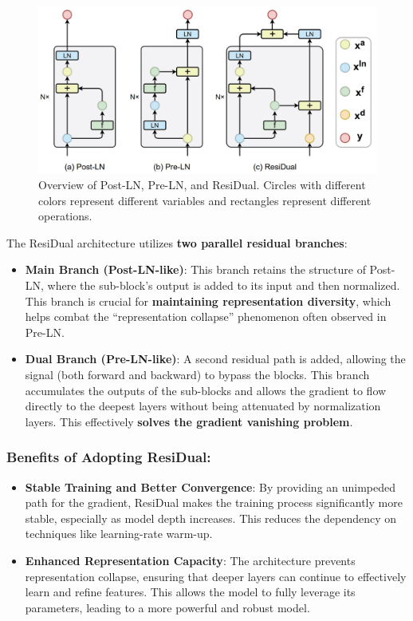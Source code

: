 \begin{figure}[H]
    \centering
    \includegraphics[width=1\linewidth]{image/residual.jpg}
    \caption{Overview of Post-LN, Pre-LN, and ResiDual. Circles with different colors represent different variables and rectangles represent different operations.}
    \label{fig:residual}
\end{figure}

The ResiDual architecture utilizes \textbf{two parallel residual branches}:

\begin{itemize}
    \item \textbf{Main Branch (Post-LN-like)}: This branch retains the structure of Post-LN, where the sub-block's output is added to its input and then normalized. This branch is crucial for \textbf{maintaining representation diversity}, which helps combat the ``representation collapse'' phenomenon often observed in Pre-LN.
    
    \item \textbf{Dual Branch (Pre-LN-like)}: A second residual path is added, allowing the signal (both forward and backward) to bypass the blocks. This branch accumulates the outputs of the sub-blocks and allows the gradient to flow directly to the deepest layers without being attenuated by normalization layers. This effectively \textbf{solves the gradient vanishing problem}.
\end{itemize}

\subsubsection*{Benefits of Adopting ResiDual:}

\begin{itemize}
    \item \textbf{Stable Training and Better Convergence}: By providing an unimpeded path for the gradient, ResiDual makes the training process significantly more stable, especially as model depth increases. This reduces the dependency on techniques like learning-rate warm-up.

    \item \textbf{Enhanced Representation Capacity}: The architecture prevents representation collapse, ensuring that deeper layers can continue to effectively learn and refine features. This allows the model to fully leverage its parameters, leading to a more powerful and robust model.
\end{itemize}